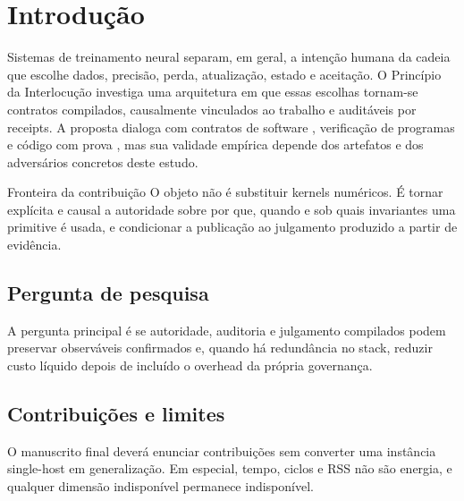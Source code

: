 \chapter{Introdução}
\label{chap:introducao}

Sistemas de treinamento neural separam, em geral, a intenção humana da cadeia
que escolhe dados, precisão, perda, atualização, estado e aceitação. O Princípio
da Interlocução investiga uma arquitetura em que essas escolhas tornam-se
contratos compilados, causalmente vinculados ao trabalho e auditáveis por
receipts. A proposta dialoga com contratos de software
\parencite{meyer1992contract}, verificação de programas
\parencite{hoare1969axiomatic} e código com prova
\parencite{necula1997pcc}, mas sua validade empírica depende dos artefatos e dos
adversários concretos deste estudo.

\begin{claimbox}{Fronteira da contribuição}
O objeto não é substituir kernels numéricos. É tornar explícita e causal a
autoridade sobre por que, quando e sob quais invariantes uma primitive é usada,
e condicionar a publicação ao julgamento produzido a partir de evidência.
\end{claimbox}

\section{Pergunta de pesquisa}

A pergunta principal é se autoridade, auditoria e julgamento compilados podem
preservar observáveis confirmados e, quando há redundância no stack, reduzir
custo líquido depois de incluído o overhead da própria governança.

\section{Contribuições e limites}

O manuscrito final deverá enunciar contribuições sem converter uma instância
single-host em generalização. Em especial, tempo, ciclos e RSS não são energia,
e qualquer dimensão indisponível permanece indisponível.

